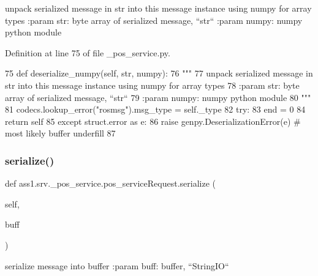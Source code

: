 \begin{DoxyVerb}unpack serialized message in str into this message instance using numpy for array types
:param str: byte array of serialized message, ``str``
:param numpy: numpy python module
\end{DoxyVerb}
 

Definition at line 75 of file \+\_\+pos\+\_\+service.\+py.


\begin{DoxyCode}
75   \textcolor{keyword}{def }deserialize\_numpy(self, str, numpy):
76     \textcolor{stringliteral}{"""}
77 \textcolor{stringliteral}{    unpack serialized message in str into this message instance using numpy for array types}
78 \textcolor{stringliteral}{    :param str: byte array of serialized message, ``str``}
79 \textcolor{stringliteral}{    :param numpy: numpy python module}
80 \textcolor{stringliteral}{    """}
81     codecs.lookup\_error(\textcolor{stringliteral}{"rosmsg"}).msg\_type = self.\_type
82     \textcolor{keywordflow}{try}:
83       end = 0
84       \textcolor{keywordflow}{return} self
85     \textcolor{keywordflow}{except} struct.error \textcolor{keyword}{as} e:
86       \textcolor{keywordflow}{raise} genpy.DeserializationError(e)  \textcolor{comment}{# most likely buffer underfill}
87 
\end{DoxyCode}
\mbox{\label{classass1_1_1srv_1_1__pos__service_1_1pos__serviceRequest_a91fc549468cf02d34424f09ee343a696}} 
\subsubsection{\texorpdfstring{serialize()}{serialize()}}
{\footnotesize\ttfamily def ass1.\+srv.\+\_\+pos\+\_\+service.\+pos\+\_\+service\+Request.\+serialize (\begin{DoxyParamCaption}\item[{}]{self,  }\item[{}]{buff }\end{DoxyParamCaption})}

\begin{DoxyVerb}serialize message into buffer
:param buff: buffer, ``StringIO``
\end{DoxyVerb}
 

